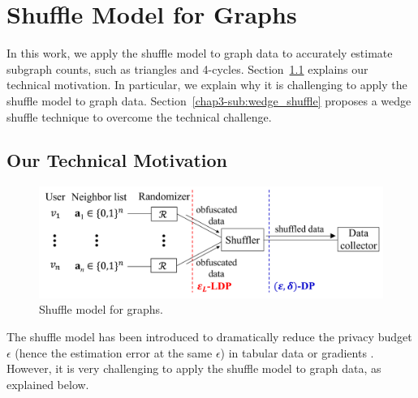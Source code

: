 \section{Shuffle Model for Graphs}
\label{chap3-sec:shuffle}
In this work, we apply the shuffle model to graph data to accurately estimate subgraph counts, such as triangles and 4-cycles. 
Section~\ref{chap3-sub:technical} explains our technical motivation. 
In particular, we explain why it is challenging to apply the shuffle model to graph data. 
Section~\ref{chap3-sub:wedge_shuffle} proposes a wedge shuffle technique to overcome the technical challenge. 

\subsection{Our Technical Motivation}
\label{chap3-sub:technical}

\begin{figure}[t]
  \centering
  \includegraphics[width=0.99\linewidth]{fig/shuffle.pdf}
  
  \caption{Shuffle model for graphs. 
  }
  \label{chap3-fig:shuffle_model}
\end{figure}

The shuffle model has been introduced to dramatically reduce the privacy budget $\epsilon$ (hence the estimation error at the same $\epsilon$) in tabular data \cite{Meehan_ICLR22,Wang_PVLDB20} or 
gradients 
\cite{Girgis_AISTATS21,Liu_AAAI21}. 
However, it is very challenging to apply the shuffle model to graph data, 
as explained below. 

